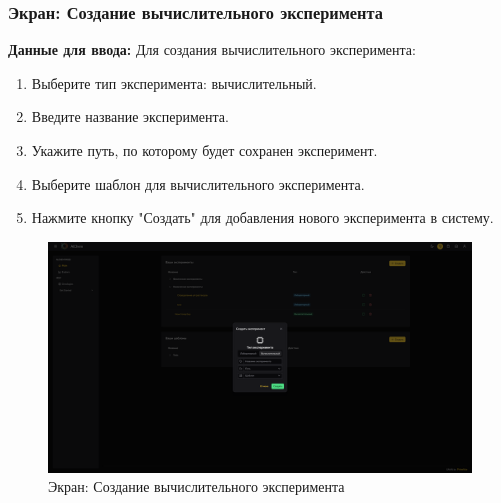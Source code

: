 \documentclass[a4paper,12pt,reqno]{article}
\begin{document}
\subsubsection{Экран: Создание вычислительного эксперимента}
\textbf{Данные для ввода:} 
Для создания вычислительного эксперимента:
\begin{enumerate}
    \item Выберите тип эксперимента: вычислительный.
    \item Введите название эксперимента.
    \item Укажите путь, по которому будет сохранен эксперимент.
    \item Выберите шаблон для вычислительного эксперимента.
    \item Нажмите кнопку "Создать" для добавления нового эксперимента в систему.
\end{enumerate}
\begin{figure}[H]
    \centering
    \includegraphics[width=\textwidth]{RO/img/create_exp.png} %
    \caption{Экран: Создание вычислительного эксперимента}
    \label{fig:create_exp}
\end{figure}
\end{document}

